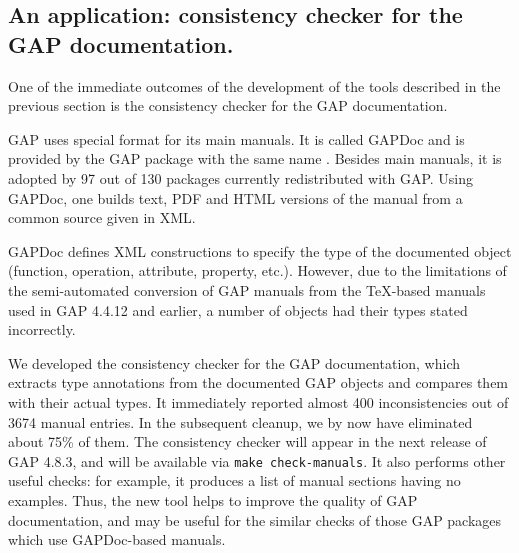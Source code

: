\subsection{An application: consistency checker for the GAP
  documentation.}\label{gap-types}

One of the immediate outcomes of the development of the tools described in the
previous section is the consistency checker for the GAP documentation. 

GAP uses special format for its main manuals. It is called GAPDoc and is 
provided by the GAP package with the same name \cite{gapdoc}. Besides main 
manuals, it is adopted by 97 out of 130 packages currently redistributed 
with GAP. Using GAPDoc, one builds text, PDF and HTML versions of the manual
from a common source given in XML.

GAPDoc defines XML constructions to specify the type of the documented object 
(function, operation, attribute, property, etc.). However, due to the 
limitations of the semi-automated conversion of GAP manuals from the \TeX-based
manuals used in GAP 4.4.12 and earlier, a number of objects had their types
stated incorrectly. 

We developed the consistency checker for the GAP documentation, which extracts
type annotations from the documented GAP objects and compares them with their
actual types. It immediately reported almost 400 inconsistencies out of 3674 
manual entries. In the subsequent cleanup, we by now have eliminated about 
75\% of them. The  consistency checker will appear in the next release of
GAP 4.8.3, and will be available via \texttt{make check-manuals}.
It also performs other useful checks: for example, it produces a list of
manual sections having no examples. Thus, the new tool helps to improve
the quality of GAP documentation, and may be useful for the similar checks
of those GAP packages which use GAPDoc-based manuals.



